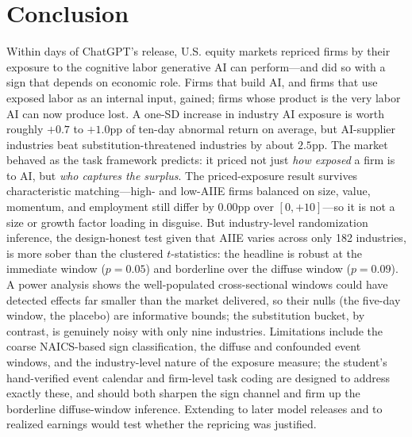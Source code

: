 \documentclass[12pt]{article}
\newcommand{\ripHead}{0.09}\newcommand{\ripTight}{0.05}\newcommand{\matchPairs}{0}%
\newcommand{\matchGapHead}{0.00}\newcommand{\matchTHead}{0.00}%
\begin{document}
\section{Conclusion}\label{sec:concl}
Within days of ChatGPT's release, U.S. equity markets repriced firms by their exposure
to the cognitive labor generative AI can perform---and did so with a sign that depends on
economic role. Firms that build AI, and firms that use exposed labor as an internal input,
gained; firms whose product is the very labor AI can now produce lost. A one-SD increase
in industry AI exposure is worth roughly $+0.7$ to $+1.0$pp of ten-day abnormal return on
average, but AI-supplier industries beat substitution-threatened industries by about
$2.5$pp. The market behaved as the task framework predicts: it priced not just \emph{how
exposed} a firm is to AI, but \emph{who captures the surplus}. The priced-exposure result
survives characteristic matching---high- and low-AIIE firms balanced on size, value, momentum,
and employment still differ by \matchGapHead{}pp over $[0,+10]$---so it is not a size or growth
factor loading in disguise. But industry-level randomization inference, the design-honest test
given that AIIE varies across only 182 industries, is more sober than the clustered $t$-statistics:
the headline is robust at the immediate window ($p=\ripTight{}$) and borderline over the diffuse
window ($p=\ripHead{}$). A power analysis shows the well-populated cross-sectional windows could
have detected effects far smaller than the market delivered, so their nulls (the five-day window,
the placebo) are informative bounds; the substitution bucket, by contrast, is genuinely noisy with
only nine industries. Limitations include the coarse NAICS-based sign classification, the diffuse
and confounded event windows, and the industry-level nature of the exposure measure; the student's
hand-verified event calendar and firm-level task coding are designed to address exactly these,
and should both sharpen the sign channel and firm up the borderline diffuse-window inference.
Extending to later model releases and to realized earnings would test whether the repricing was
justified.
\end{document}
